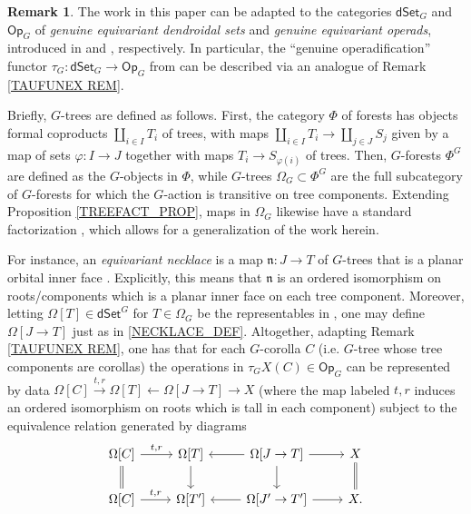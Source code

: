 \documentclass[a4paper,10pt
,draft
]{article}%
\numberwithin{equation}{section}
\numberwithin{figure}{section}
\theoremstyle{definition} %
\newtheorem{remark}[equation]{Remark}%
\newcommand{\Op}{\mathsf{Op}}%
\newcommand{\dSet}{\mathsf{dSet}}
\newcommand{\1}{\ensuremath{\mathbbm 1}}%
\begin{document}
\begin{remark}\label{GTAUFUNEX REM}
	The work in this paper can be adapted to the categories
	$\mathsf{dSet}_G$ and $\mathsf{Op}_G$
	of \textit{genuine equivariant dendroidal sets} and \textit{genuine equivariant operads},
	introduced in \cite[\S 5.4]{Per18} and \cite{BP_geo}, respectively.
%	
	In particular, 
	the ``genuine operadification'' functor
	$\tau_G \colon \mathsf{dSet}_G \to \mathsf{Op}_G$
	from
	\cite[ \eqref{TAS-TAUFUNCTS EQ}]{BP_TAS}
	can be described via an analogue of
	Remark \ref{TAUFUNEX REM}.

Briefly, $G$-trees are defined as follows. 
First, the category $\Phi$ of forests has objects
formal coproducts $\amalg_{i\in I} T_i$ of trees,
with maps $\amalg_{i\in I} T_i \to \amalg_{j\in J} S_j$
given by a map of sets $\varphi \colon I \to J$ together with maps
$T_i \to S_{\varphi (i)}$ of trees.
Then, $G$-forests $\Phi^G$ are defined as the $G$-objects in $\Phi$,
while $G$-trees $\Omega_G \subset \Phi^G$
are the full subcategory of $G$-forests for which
the $G$-action is transitive on tree components.
Extending Proposition \ref{TREEFACT_PROP},
maps in $\Omega_G$ likewise have a standard factorization
\cite[Cor. \ref{TAS-OMGFACT COR}]{BP_TAS},
which allows for a generalization of the work herein.

For instance, an \emph{equivariant necklace}
is a map $\mathfrak{n} \colon J \to T$ of $G$-trees
that is a planar orbital inner face 
\cite[Def. \ref{TAS-DENDNECK DEF}]{BP_TAS}.
Explicitly, this means that $\mathfrak{n}$
is an ordered isomorphism on roots/components which is a planar inner face on each tree component.
Moreover, letting $\Omega[T] \in \dSet^G$ for $T \in \Omega_G$
 be the representables 
in \cite[\S\ref{TAS-EDS_SEC}]{BP_TAS},
one may define $\Omega[J \to T]$ just as in 
\eqref{NECKLACE_DEF}.
Altogether, adapting Remark \ref{TAUFUNEX REM},
one has that for each $G$-corolla $C$ (i.e. $G$-tree whose tree components are corollas)
the operations in 
$\tau_G X(C) \in \Op_G$
can be represented by data
$\Omega[C] \xrightarrow{t,r}
\Omega[T] \leftarrow
\Omega[J \to T] \to 
X$
(where the map labeled $t,r$ induces an ordered isomorphism on roots which is tall in each component)
subject to the equivalence relation generated by diagrams
\[
\begin{tikzcd}
\Omega[C] \ar{r}{t,r} \ar[equal]{d} &
\Omega[T] \ar{d} &
\Omega[J \to T] \ar{l} \ar{r} \ar{d} &
X \ar[equal]{d}
\\
\Omega[C] \ar{r}{t,r} &
\Omega[T'] &
\Omega[J' \to T'] \ar{l} \ar{r} &
X.
\end{tikzcd}
\]
\end{remark}
\end{document}
